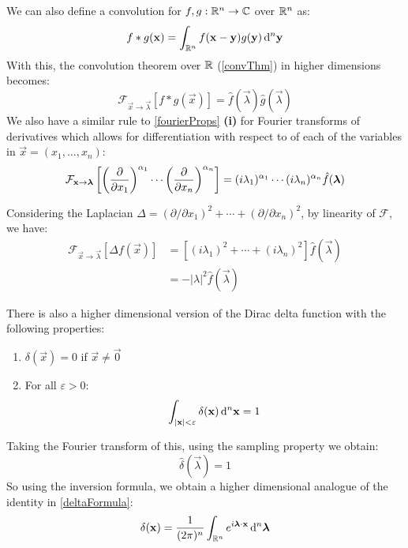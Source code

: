 \documentclass[../main.tex]{subfiles}
\begin{document}
We can also define a convolution for $f, g: \mathbb{R}^{n} \to \mathbb{C}$ over $\mathbb{R}^{n}$ as:
\[
  f \ast g(\vec{x}) = \int_{\R^{n}} f(\vec{x} - \vec{y}) g(\vec{y}) \d^{n}{\vec{y}}
\]
With this, the convolution theorem over $\mathbb{R}$ (\cref{convThm}) in higher dimensions becomes:
\[
  \mathcal{F}_{\vec{x} \to \vec{\lambda}}[f \ast g(\vec{x})] = \hat{f}(\vec{\lambda}) \hat{g}(\vec{\lambda})
\]
We also have a similar rule to \cref{fourierProps} \textbf{(i)} for Fourier transforms of derivatives which allows for differentiation with respect to of each of the variables in $\vec{x} = (x_1, \ldots, x_n)$:
\[
  \mathcal{F}_{\vec{x} \to \vec{\lambda}}\left[\left(\pderiv{}{x_1}\right)^{\alpha_1} \cdots \left(\pderiv{}{x_n}\right)^{\alpha_n}\right] = (i \lambda_1)^{\alpha_1} \cdots (i \lambda_n)^{\alpha_n} \hat{f}(\vec{\lambda})
\]
\begin{example}
  Considering the Laplacian $\Delta = (\partial/\partial x_1)^2 + \cdots + (\partial/\partial x_n)^2$, by linearity of $\mathcal{F}$, we have: \label{FTLP}
  \begin{align*}
    \mathcal{F}_{\vec{x} \to \vec{\lambda}}[\Delta f(\vec{x})] &= [(i \lambda_1)^2 + \cdots + (i\lambda_n)^2] \hat{f}(\vec{\lambda}) \\
                                                               &= - |\lambda|^2 \hat{f}(\vec{\lambda})
  \end{align*}
\end{example}
There is also a higher dimensional version of the Dirac delta function with the following properties:
\begin{enumerate}
  \item $\delta(\vec{x}) = 0$ if $\vec{x} \neq \vec{0}$
  \item For all $\varepsilon > 0$:
    \[
      \int_{|\vec{x}| < \varepsilon} \delta(\vec{x}) \d^{n}{\vec{x}} = 1
    \]
\end{enumerate}
Taking the Fourier transform of this, using the sampling property we obtain:
\begin{equation}
  \hat{\delta}(\vec{\lambda}) = 1 \label{FTDelta}
\end{equation}
So using the inversion formula, we obtain a higher dimensional analogue of the identity in \cref{deltaFormula}:
\[
  \delta(\vec{x}) = \frac{1}{(2\pi)^{n}} \int_{\R^{n}}  e^{i \vec{\lambda} \cdot \vec{x}} \d^{n}{\vec{\lambda}}
\]
\end{document}
